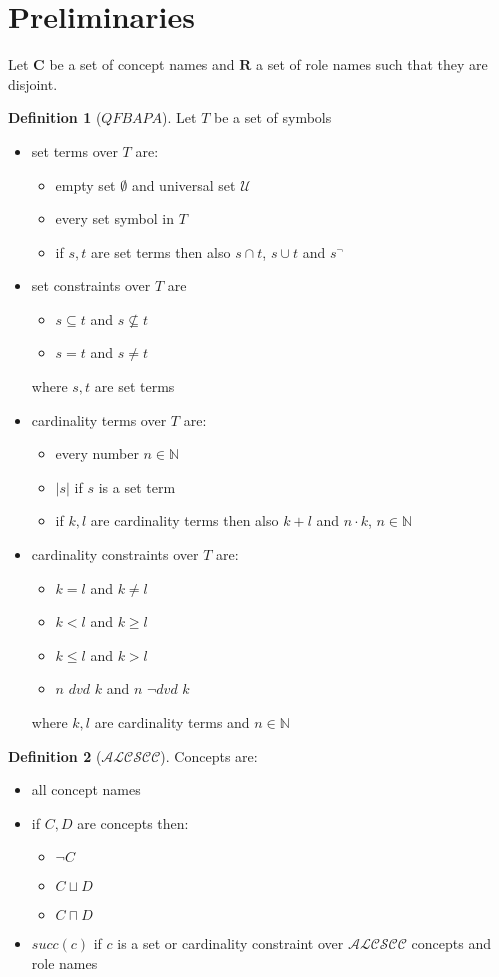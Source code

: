 \documentclass[a4paper,11pt]{scrartcl}
\theoremstyle{break}
\theoremstyle{definition}
\newtheorem{mydef}{Definition}
\begin{document}
\section{Preliminaries}
Let $\mathbf{C}$ be a set of concept names and $\mathbf{R}$ a set of role names such that they are disjoint.
\begin{mydef}[$QFBAPA$]
Let $T$ be a set of symbols
\begin{itemize}
\item set terms over $T$ are:
\begin{itemize}
\item empty set $\emptyset$ and universal set $
\mathcal{U}$
\item every set symbol in $T$
\item if $s,t$ are set terms then also $s\cap t$, $s\cup t$ and $s^{\neg}$
\end{itemize}
\item set constraints over $T$ are
\begin{itemize}
\item $s\subseteq t$ and $s\not\subseteq t$
\item $s=t$ and $s\neq t$
\end{itemize}
where $s,t$ are set terms
\item cardinality terms over $T$ are:
\begin{itemize}
\item every number $n\in \mathbb{N}$
\item $|s|$ if $s$ is a set term
\item if $k,l$ are cardinality terms then also $k+l$ and $n\cdot k$, $n\in \mathbb{N}$
\end{itemize}
\item cardinality constraints over $T$ are:
\begin{itemize}
\item $k=l$ and $k\neq l$
\item $k<l$ and $k\geq l$
\item $k\leq l$ and $k>l$
\item $n$ $dvd$ $k$ and $n$ $\neg dvd$ $k$
\end{itemize}
where $k,l$ are cardinality terms and $n\in\mathbb{N}$
\end{itemize}
\end{mydef}
\begin{mydef}[$\mathcal{ALCSCC}$]
Concepts are:
\begin{itemize}
\item all concept names
\item if $C,D$ are concepts then:
\begin{itemize}
\item $\neg C$
\item $C\sqcup D$
\item $C\sqcap D$
\end{itemize}
\item $succ(c)$ if $c$ is a set or cardinality constraint over $\mathcal{ALCSCC}$ concepts and role names
\end{itemize}
\end{mydef}
\end{document}
